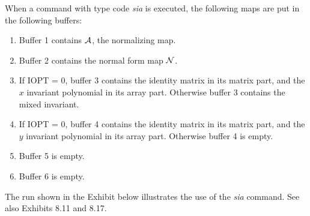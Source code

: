 When a command with type code {\em sia } is executed, the following maps
are put in the following buffers:
\begin{enumerate}
           \item  Buffer 1 contains ${\cal A}$, the normalizing map.

           \item  Buffer 2 contains the normal form map ${\cal N}$.

           \item  If IOPT = 0, buffer 3 contains the identity matrix in its
                  matrix part, and the $x$ invariant polynomial in its array
                  part.  Otherwise buffer 3 contains the mixed invariant.

           \item  If IOPT = 0, buffer 4 contains the identity matrix in its
                  matrix part, and the $y$ invariant polynomial in its array
                  part.  Otherwise buffer 4 is empty.

           \item  Buffer 5 is empty.

		   \item  Buffer 6 is empty.
\end{enumerate}

     The \Mary run shown in the Exhibit below illustrates the use of the {\em sia} command.  See also Exhibits 8.11 and 8.17.


